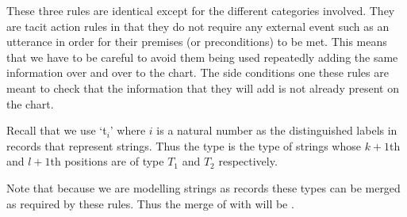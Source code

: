 These three rules are identical except for the different categories
involved.  They are tacit action rules in that they do not require any
external event such as an utterance in order for their premises (or
preconditions) to be met.  This means that we have to be careful to
avoid them being used repeatedly adding the same information over and
over to the chart.  The side conditions one these rules are meant to
check that the information that they will add is not already present
on the chart.

Recall that we use `t$_i$' where $i$ is a natural number as the
distinguished labels in records that represent strings.  Thus the type
\nexteg{} is the type of strings whose $k+1$th and $l+1$th positions
are of type $T_1$ and $T_2$ respectively.
\begin{ex} 
    
\end{ex}
Note that because we are modelling strings as records these types can
be merged as required by these rules.  Thus the merge of \preveg{}
with  will be .
\begin{ex} 
\begin{subex} 
 
\item {} 
 
\item {} 
 
\end{subex} 
   
\end{ex} 
  



